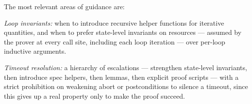 The most relevant areas of guidance are:
\begin{Itemize}
\item \emph{Loop invariants:} when to introduce recursive helper functions for iterative quantities, and when to prefer state-level invariants on resources --- assumed by the prover at every call site, including each loop iteration --- over per-loop inductive arguments.
\item \emph{Timeout resolution:} a hierarchy of escalations --- strengthen state-level invariants, then introduce spec helpers, then lemmas, then explicit proof scripts --- with a strict prohibition on weakening abort or postconditions to silence a timeout, since this gives up a real property only to make the proof succeed.
\end{Itemize}

